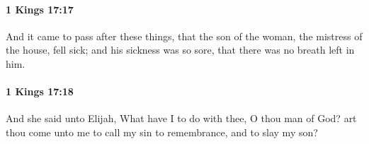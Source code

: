 		\paragraph{1 Kings 17:17} %
			\label{1KINGS-17-17}

			And it came to pass after these things, that the son of the woman, the mistress of the house, fell sick; and his sickness was so sore, that there was no breath left in him.


		\paragraph{1 Kings 17:18} %
			\label{1KINGS-17-18}

			And she said unto Elijah, What have I to do with thee, O thou man of God? art thou come unto me to call my sin to remembrance, and to slay my son?


